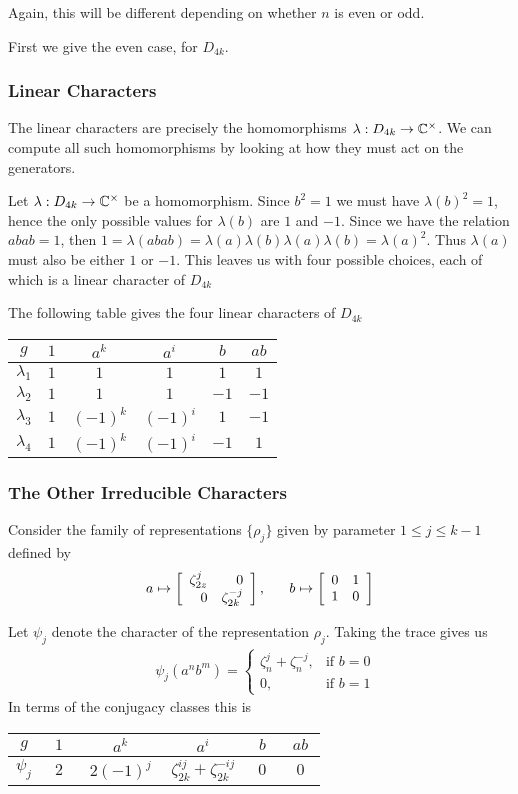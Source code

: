 Again, this will be different depending on whether $n$ is even or odd. 

First we give the even case, for $D_{4k}$.

\subsubsection{Linear Characters}
The linear characters are precisely the homomorphisms $\lambda : D_{4k} \rightarrow \mathbb{C}^\times$. We can compute all 
such homomorphisms by looking at how they must act on the generators. 

Let $\lambda : D_{4k} \rightarrow \mathbb{C}^\times$ be a homomorphism. Since $b^2 = 1$ we must have $\lambda(b)^2 = 1$, 
hence the only possible values for $\lambda(b)$ are $1$ and $-1$. Since we have the relation $abab = 1$, then $1 = 
\lambda(abab) = \lambda(a)\lambda(b)\lambda(a)\lambda(b) = \lambda(a)^2$. Thus $\lambda(a)$ must also be either $1$ 
or $-1$. This leaves us with four possible choices, each of which is a linear character of $D_{4k}$

The following table gives the four linear characters of $D_{4k}$
\begin{center}
\begin{tabular}{c|ccccc}
    $g$ &$1$ & $a^k$ & $a^i$ & $b$ & $ab$ \\ \hline
    $\lambda_1$ & $1$ & $1$ & $1$ & $1$ & $1$ \\
    $\lambda_2$ & $1$ & $1$ & $1$ & $-1$ & $-1$ \\
    $\lambda_3$ & $1$ & $(-1)^k$ & $(-1)^i$ & $1$ & $-1$ \\
    $\lambda_4$ & $1$ & $(-1)^k$ & $(-1)^i$ & $-1$ & $1$ \\
\end{tabular}
\end{center}

\subsubsection{The Other Irreducible Characters}
Consider the family of representations $\{\rho_j\}$ given by parameter $1 \leq j \leq k-1$ defined by
\[
    a \mapsto \left[\begin{array}{rr}\zeta_{2z}^j&0\\0&\zeta_{2k}^{-j}\end{array}\right], \quad \ \ b \mapsto \left[\begin{array}{rr}0&1\\1&0\end{array}\right]
\]

Let $\psi_j$ denote the character of the representation $\rho_j$. Taking the trace gives us
\begin{align*}
    &\psi_j(a^nb^m) = \begin{cases}
        \zeta_n^j + \zeta_n^{-j}, &\text{if } b = 0 \\
        0,                &\text{if } b =1
                    \end{cases}
\end{align*}
In terms of the conjugacy classes this is
\begin{center}
\begin{tabular}{c|ccccc}
    $g$ &$1$ & $a^k$ & $a^i$ & $b$ & $ab$ \\ \hline
    $\psi_j$ & $ \ \ 2 \ \ $ & $\ 2(-1)^j\ $ & $\zeta_{2k}^{ij} + \zeta_{2k}^{-ij}$ & $\ \ 0 \ \ $ & $ \ \ 0 \ \ $
\end{tabular}
\end{center}

